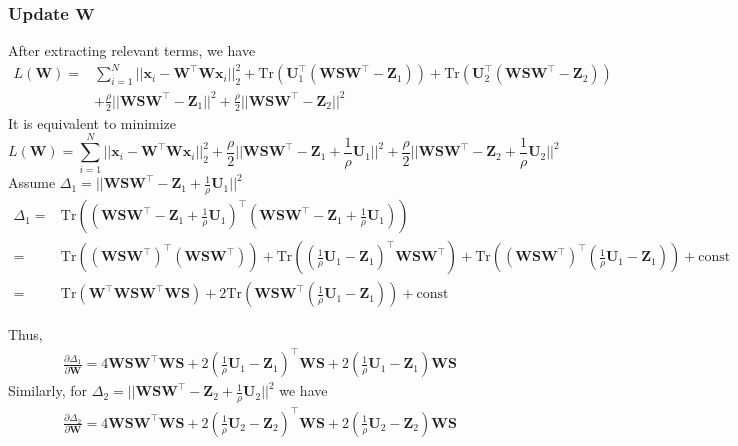 \documentclass{article} %
\begin{document}
\subsubsection{Update $\mathbf{W}$}
After extracting relevant terms, we have
\begin{align}
L(\mathbf{W})=&\sum_{i=1}^{N}||\mathbf{x}_i-\mathbf{W}^{\top}\mathbf{W}\mathbf{x}_i||_2^2 +
\text{Tr}(\mathbf{U}_1^{\top}(\mathbf{W}\mathbf{S}\mathbf{W}^\top-\mathbf{Z}_1)) \nonumber
+\text{Tr}(\textbf{U}_2^{\top}(\mathbf{W}\mathbf{S}\mathbf{W}^\top-\mathbf{Z}_2)) \\
&+ \frac{\rho}{2}||\mathbf{W}\mathbf{S}\mathbf{W}^\top-\mathbf{Z}_1||^2 + \frac{\rho}{2}||\mathbf{W}\mathbf{S}\mathbf{W}^\top-\mathbf{Z}_2||^2
\end{align}
It is equivalent to minimize
\[
L(\mathbf{W})=\sum_{i=1}^{N}||\mathbf{x}_i-\mathbf{W}^{\top}\mathbf{W}\mathbf{x}_i||_2^2 + \frac{\rho}{2}||\mathbf{W}\mathbf{S}\mathbf{W}^\top-\mathbf{Z}_1 + \frac{1}{\rho}\mathbf{U}_1||^2 + \frac{\rho}{2}||\mathbf{W}\mathbf{S}\mathbf{W}^\top-\mathbf{Z}_2 + \frac{1}{\rho}\mathbf{U}_2||^2
\]
Assume $\Delta_1=||\mathbf{W}\mathbf{S}\mathbf{W}^\top-\mathbf{Z}_1 + \frac{1}{\rho}\mathbf{U}_1||^2$
\begin{align}
\Delta_1 =& \text{Tr}((\mathbf{W}\mathbf{S}\mathbf{W}^\top-\mathbf{Z}_1 + \frac{1}{\rho}\mathbf{U}_1)^{\top}(\mathbf{W}\mathbf{S}\mathbf{W}^\top-\mathbf{Z}_1 + \frac{1}{\rho}\mathbf{U}_1))\nonumber\\
=&\text{Tr}((\mathbf{W}\mathbf{S}\mathbf{W}^{\top})^{\top}(\mathbf{W}\mathbf{S}\mathbf{W}^{\top})) + \text{Tr}((\frac{1}{\rho}\mathbf{U}_1-\mathbf{Z}_1)^{\top}\mathbf{W}\mathbf{S}\mathbf{W}^{\top})+\text{Tr}
((\mathbf{W}\mathbf{S}\mathbf{W}^{\top})^{\top}(\frac{1}{\rho}\mathbf{U}_1-\mathbf{Z}_1)) +\text{const} \nonumber\\
=&\text{Tr}(\mathbf{W}^{\top}\mathbf{W}\mathbf{S}\mathbf{W}^{\top}\mathbf{W}\mathbf{S}) + 2\text{Tr}(\mathbf{W}\mathbf{S}\mathbf{W}^{\top}(\frac{1}{\rho}\mathbf{U}_1-\mathbf{Z}_1)) + \text{const}
\end{align}

Thus,
\begin{align}
\frac{\partial \Delta_1}{\partial \mathbf{W}} = 4\mathbf{W}\mathbf{S}\mathbf{W}^{\top}\mathbf{W}\mathbf{S} + 2(\frac{1}{\rho}\mathbf{U}_1-\mathbf{Z}_1)^{\top}\mathbf{W}\mathbf{S}+2(\frac{1}{\rho}\mathbf{U}_1-\mathbf{Z}_1)\mathbf{W}\mathbf{S}
\end{align}
Similarly, for $\Delta_2=||\mathbf{W}\mathbf{S}\mathbf{W}^\top-\mathbf{Z}_2 + \frac{1}{\rho}\mathbf{U}_2||^2$  we have
\begin{align}
\frac{\partial \Delta_2}{\partial \mathbf{W}} = 4\mathbf{W}\mathbf{S}\mathbf{W}^{\top}\mathbf{W}\mathbf{S} + 2(\frac{1}{\rho}\mathbf{U}_2-\mathbf{Z}_2)^{\top}\mathbf{W}\mathbf{S}+2(\frac{1}{\rho}\mathbf{U}_2-\mathbf{Z}_2)\mathbf{W}\mathbf{S}
\end{align}
\end{document}
